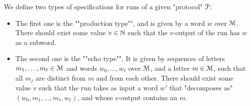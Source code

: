 \begin{definition}
	We define two types of specifications for runs of a given "protocol" $\mathcal{P}$:
	
	\begin{itemize}
		\item The first one is the ""production type"", and is given by a word $w$ over $\mathcal{M}$. There should exist some value $v \in \mathbb{N}$ such that the $v$-output of the run has $w$ as a subword.
		
		\item The second one is the ""echo type"". It is given by sequences of letters $m_1, \ldots, m_\ell \in \mathcal{M}$ and words $w_0, \ldots, w_\ell$ over $\mathcal{M}$, and a letter $m \in \mathcal{M}$, such that all $m_j$ are distinct from $m$ and from each other.
		There should exist some value $v$ such that the run takes as input a word $w'$ that "decomposes as" $(w_0, m_1, \ldots, m_\ell, w_\ell)$, and whose $v$-output contains an $m$.
	\end{itemize}
\end{definition}


